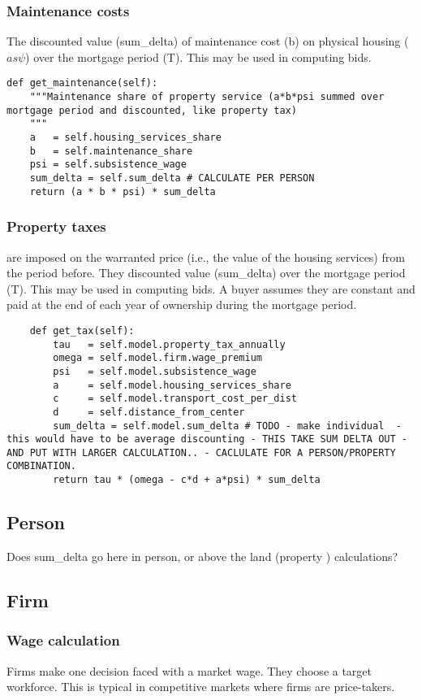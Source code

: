 \subsubsection{Maintenance costs} The discounted value (sum\_delta) of maintenance cost (b) on  physical housing ($as\psi$) over the mortgage period (T). This may be used in computing bids.
\begin{lstlisting}
def get_maintenance(self):
    """Maintenance share of property service (a*b*psi summed over mortgage period and discounted, like property tax)
    """
    a   = self.housing_services_share
    b   = self.maintenance_share
    psi = self.subsistence_wage
    sum_delta = self.sum_delta # CALCULATE PER PERSON
    return (a * b * psi) * sum_delta  
\end{lstlisting}

\subsubsection{Property taxes}
are imposed on the  warranted price (i.e., the value of the housing services) from the period before. They  discounted value (sum\_delta)  over the mortgage period (T). This may be used in computing bids. A buyer assumes they are constant and paid at the end of each year of ownership during the mortgage period.
\begin{lstlisting}
    def get_tax(self):
        tau   = self.model.property_tax_annually
        omega = self.model.firm.wage_premium 
        psi   = self.model.subsistence_wage
        a     = self.model.housing_services_share
        c     = self.model.transport_cost_per_dist
        d     = self.distance_from_center
        sum_delta = self.model.sum_delta # TODO - make individual  - this would have to be average discounting - THIS TAKE SUM DELTA OUT - AND PUT WITH LARGER CALCULATION.. - CACLULATE FOR A PERSON/PROPERTY COMBINATION.
        return tau * (omega - c*d + a*psi) * sum_delta
\end{lstlisting}

\subsection{Person}
Does sum\_delta go here in person, or above the land (property ) calculations?  
\subsection{Firm}

\subsubsection{Wage calculation}
Firms make one decision faced with a market wage. They choose a target workforce. This is typical in \glspl{competitive market} where firms are price-takers. 


